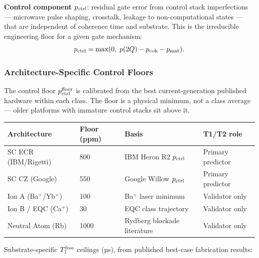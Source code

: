 \documentclass[12pt,a4paper]{article}
\begin{document}
\textbf{Control component} $p_{\rm ctrl}$: residual gate error from control
stack imperfections --- microwave pulse shaping, crosstalk, leakage to
non-computational states --- that are independent of coherence time and
substrate. This is the irreducible engineering floor for a given gate mechanism:
\begin{equation}
p_{\rm ctrl} = \max(0,\; p(2Q) - p_{\rm coh} - p_{\rm mat}).
\label{eq:p_ctrl}
\end{equation}

\subsubsection{Architecture-Specific Control Floors}

The control floor $p_{\rm ctrl}^{\rm floor}$ is calibrated from the
best current-generation published hardware within each class.
The floor is a physical minimum, not a class average --- older
platforms with immature control stacks sit above it.

\begin{center}
\begin{tabular}{llll}
\toprule
\textbf{Architecture} & \textbf{Floor (ppm)} & \textbf{Basis} & \textbf{T1/T2 role} \\
\midrule
SC ECR (IBM/Rigetti) & 800 & IBM Heron R2 $p_{\rm ctrl}$ & Primary predictor \\
SC CZ (Google)       & 550 & Google Willow $p_{\rm ctrl}$ & Primary predictor \\
Ion A (Ba$^+$/Yb$^+$) & 100 & Ba$^+$ laser minimum & Validator only \\
Ion B / EQC (Ca$^+$) &  30 & EQC class trajectory & Validator only \\
Neutral Atom (Rb)  & 1000 & Rydberg blockade literature & Validator only \\
\bottomrule
\end{tabular}
\label{tab:ctrl_floors}
\end{center}

Substrate-specific $T_1^{\rm free}$ ceilings (µs), from published best-case
fabrication results:
\end{document}

